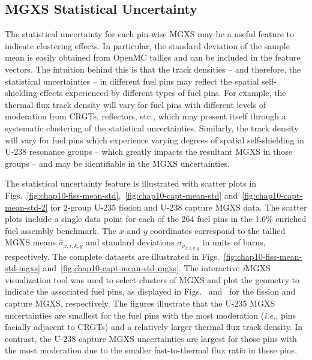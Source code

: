 

\subsection{MGXS Statistical Uncertainty}
\label{subsec:chap10-stat-uncertainty}

The statistical uncertainty for each pin-wise \ac{MGXS} may be a useful feature to indicate clustering effects. In particular, the standard deviation of the sample mean is easily obtained from OpenMC tallies and can be included in the feature vectors. The intuition behind this is that the track densities -- and therefore, the statistical uncertainties -- in different fuel pins may reflect the spatial self-shielding effects experienced by different types of fuel pins. For example, the thermal flux track density will vary for fuel pins with different levels of moderation from \acp{CRGT}, reflectors, etc., which may present itself through a systematic clustering of the statistical uncertainties. Similarly, the track density will vary for fuel pins which experience varying degrees of spatial self-shielding in U-238 resonance groups -- which greatly impacts the resultant \ac{MGXS} in those groups -- and may be identifiable in the \ac{MGXS} uncertainties.

The statistical uncertainty feature is illustrated with scatter plots in Figs.~\ref{fig:chap10-fiss-mean-std},~\ref{fig:chap10-capt-mean-std} and~\ref{fig:chap10-capt-mean-std-2} for 2-group U-235 fission and U-238 capture \ac{MGXS} data. The scatter plots include a single data point for each of the 264 fuel pins in the 1.6\% enriched fuel assembly benchmark. The $x$ and $y$ coordinates correspond to the tallied \ac{MGXS} means $\hat{\sigma}_{x,i,k,g}$ and standard deviations $\sigma_{\hat{\sigma}_{x,i,k,g}}$ in units of barns, respectively. The complete datasets are illustrated in Figs.~\ref{fig:chap10-fiss-mean-std-mgxs} and~\ref{fig:chap10-capt-mean-std-mgxs}. The interactive \textit{i}\ac{MGXS} visualization tool was used to select clusters of \ac{MGXS} and plot the geometry to indicate the associated fuel pins, as displayed in Figs.~ and~ for the fission and capture \ac{MGXS}, respectively. The figures illustrate that the U-235 \ac{MGXS} uncertainties are smallest for the fuel pins with the most moderation (\textit{i.e.}, pins facially adjacent to \acp{CRGT}) and a relatively larger thermal flux track density. In contrast, the U-238 capture \ac{MGXS} uncertainties are largest for those pins with the most moderation due to the smaller fast-to-thermal flux ratio in these pins.


